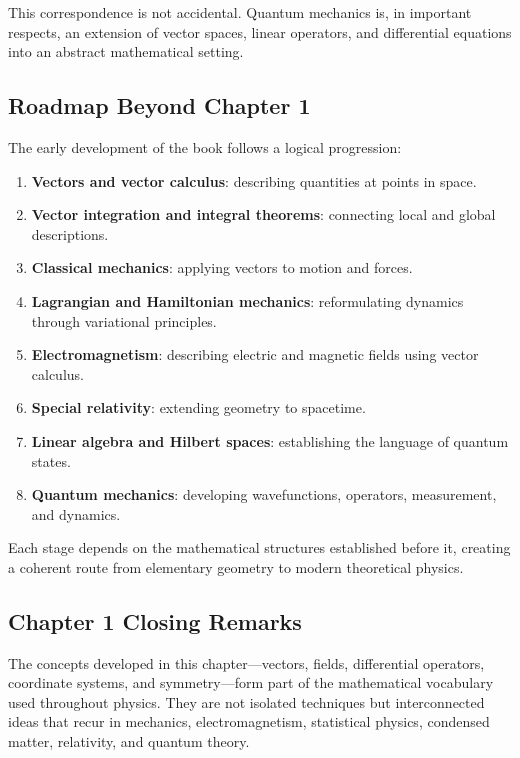 This correspondence is not accidental. Quantum mechanics is, in important
respects, an extension of vector spaces, linear operators, and differential
equations into an abstract mathematical setting.

\subsection{Roadmap Beyond Chapter 1}

The early development of the book follows a logical progression:

\begin{enumerate}
\item \textbf{Vectors and vector calculus}: describing quantities at points in
space.
\item \textbf{Vector integration and integral theorems}: connecting local and
global descriptions.
\item \textbf{Classical mechanics}: applying vectors to motion and forces.
\item \textbf{Lagrangian and Hamiltonian mechanics}: reformulating dynamics
through variational principles.
\item \textbf{Electromagnetism}: describing electric and magnetic fields using
vector calculus.
\item \textbf{Special relativity}: extending geometry to spacetime.
\item \textbf{Linear algebra and Hilbert spaces}: establishing the language of
quantum states.
\item \textbf{Quantum mechanics}: developing wavefunctions, operators,
measurement, and dynamics.
\end{enumerate}

Each stage depends on the mathematical structures established before it,
creating a coherent route from elementary geometry to modern theoretical
physics.

\subsection{Chapter 1 Closing Remarks}

The concepts developed in this chapter---vectors, fields, differential
operators, coordinate systems, and symmetry---form part of the mathematical
vocabulary used throughout physics. They are not isolated techniques but
interconnected ideas that recur in mechanics, electromagnetism, statistical
physics, condensed matter, relativity, and quantum theory.

